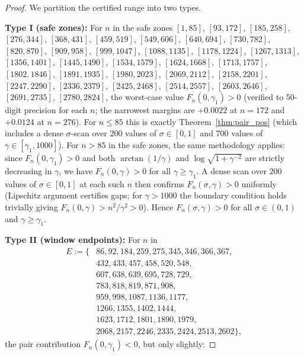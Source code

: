 \documentclass[11pt]{article}
\begin{document}
\begin{proof}
We partition the certified range into two types.

\textbf{Type I (safe zones):}
For $n$ in the safe zones
$[1,85]$, $[93,172]$, $[185,258]$, $[276,344]$, $[368,431]$, $[459,519]$,
$[549,606]$, $[640,694]$, $[730,782]$, $[820,870]$, $[909,958]$,
$[999,1047]$, $[1088,1135]$, $[1178,1224]$,
$[1267,1313]$, $[1356,1401]$, $[1445,1490]$,
$[1534,1579]$, $[1624,1668]$, $[1713,1757]$,
$[1802,1846]$, $[1891,1935]$, $[1980,2023]$,
$[2069,2112]$, $[2158,2201]$, $[2247,2290]$,
$[2336,2379]$, $[2425,2468]$, $[2514,2557]$,
$[2603,2646]$, $[2691,2735]$,
$[2780,2824]$,
the worst-case value $F_n(0,\gamma_1) > 0$ (verified to 50-digit precision
for each $n$; the narrowest margins are $+0.0022$ at $n=172$ and $+0.0124$ at $n=276$).
For $n \le 85$ this is exactly Theorem~\ref{thm:pair_pos} (which includes a dense
$\sigma$-scan over $200$ values of $\sigma\in[0,1]$ and $700$ values of $\gamma\in[\gamma_1,1000]$).
For $n > 85$ in the safe zones, the same methodology applies: since $F_n(0,\gamma_1) > 0$
and both $\arctan(1/\gamma)$ and $\log\sqrt{1+\gamma^{-2}}$ are strictly decreasing in $\gamma$,
we have $F_n(0,\gamma) > 0$ for all $\gamma \ge \gamma_1$. A dense scan over $200$ values
of $\sigma\in[0,1]$ at each such $n$ then confirms $F_n(\sigma,\gamma) > 0$ uniformly
(Lipschitz argument certifies gaps; for $\gamma > 1000$ the boundary condition holds trivially
giving $F_n(0,\gamma) > n^2/\gamma^2 > 0$).
Hence $F_n(\sigma,\gamma) > 0$ for all $\sigma \in (0,1)$ and $\gamma \geq \gamma_1$.

\textbf{Type II (window endpoints):}
For $n$ in
\begin{align*}
  E := \{&86, 92, 184, 259, 275, 345, 346, 366, 367, \\
         &432, 433, 457, 458, 520, 548, \\
         &607, 638, 639, 695, 728, 729, \\
         &783, 818, 819, 871, 908, \\
         &959, 998, 1087, 1136, 1177, \\
         &1266, 1355, 1402, 1444, \\
         &1623, 1712, 1801, 1890, 1979, \\
         &2068, 2157, 2246, 2335, 2424, 2513, 2602\},
\end{align*}
the pair contribution $F_n(0,\gamma_1) < 0$, but only slightly:


\end{proof}
\end{document}
